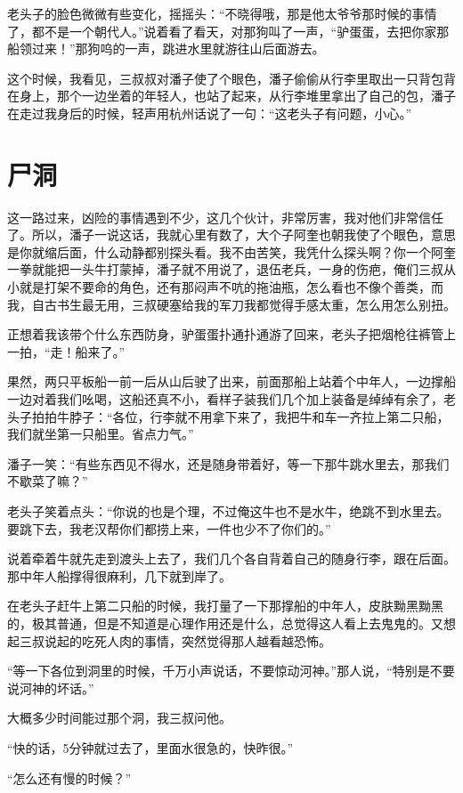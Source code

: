 老头子的脸色微微有些变化，摇摇头：“不晓得哦，那是他太爷爷那时候的事情了，都不是一个朝代人。”说着看了看天，对那狗叫了一声，“驴蛋蛋，去把你家那船领过来！”那狗呜的一声，跳进水里就游往山后面游去。

这个时候，我看见，三叔叔对潘子使了个眼色，潘子偷偷从行李里取出一只背包背在身上，那个一边坐着的年轻人，也站了起来，从行李堆里拿出了自己的包，潘子在走过我身后的时候，轻声用杭州话说了一句：“这老头子有问题，小心。”

\chapter{尸洞}

这一路过来，凶险的事情遇到不少，这几个伙计，非常厉害，我对他们非常信任了。所以，潘子一说这话，我就心里有数了，大个子阿奎也朝我使了个眼色，意思是你就缩后面，什么动静都别探头看。我不由苦笑，我凭什么探头啊？你一个阿奎一拳就能把一头牛打蒙掉，潘子就不用说了，退伍老兵，一身的伤疤，俺们三叔从小就是打架不要命的角色，还有那闷声不吭的拖油瓶，怎么看也不像个善类，而我，自古书生最无用，三叔硬塞给我的军刀我都觉得手感太重，怎么用怎么别扭。

正想着我该带个什么东西防身，驴蛋蛋扑通扑通游了回来，老头子把烟枪往裤管上一拍，“走！船来了。”

果然，两只平板船一前一后从山后驶了出来，前面那船上站着个中年人，一边撑船一边对着我们吆喝，这船还真不小，看样子装我们几个加上装备是绰绰有余了，老头子拍拍牛脖子：“各位，行李就不用拿下来了，我把牛和车一齐拉上第二只船，我们就坐第一只船里。省点力气。”

潘子一笑：“有些东西见不得水，还是随身带着好，等一下那牛跳水里去，那我们不歇菜了嘛？”

老头子笑着点头：“你说的也是个理，不过俺这牛也不是水牛，绝跳不到水里去。要跳下去，我老汉帮你们都捞上来，一件也少不了你们的。”

说着牵着牛就先走到渡头上去了，我们几个各自背着自己的随身行李，跟在后面。那中年人船撑得很麻利，几下就到岸了。

在老头子赶牛上第二只船的时候，我打量了一下那撑船的中年人，皮肤黝黑黝黑的，极其普通，但是不知道是心理作用还是什么，总觉得这人看上去鬼鬼的。又想起三叔说起的吃死人肉的事情，突然觉得那人越看越恐怖。

“等一下各位到洞里的时候，千万小声说话，不要惊动河神。”那人说，“特别是不要说河神的坏话。”

大概多少时间能过那个洞，我三叔问他。

“快的话，5分钟就过去了，里面水很急的，快昨很。”

“怎么还有慢的时候？”

